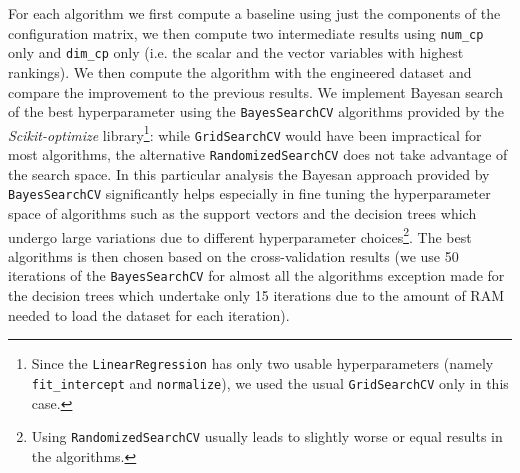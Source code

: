     For each algorithm we first compute a baseline using just the components of the configuration matrix, we then compute two intermediate results using \texttt{num\_cp} only and \texttt{dim\_cp} only (i.e. the scalar and the vector variables with highest rankings). We then compute the algorithm with the engineered dataset and compare the improvement to the previous results. We implement Bayesan search of the best hyperparameter using the \texttt{BayesSearchCV} algorithms provided by the \textit{Scikit-optimize} library\footnote{Since the \texttt{LinearRegression} has only two usable hyperparameters (namely \texttt{fit\_intercept} and \texttt{normalize}), we used the usual \texttt{GridSearchCV} only in this case.}: while \texttt{GridSearchCV} would have been impractical for most algorithms, the alternative \texttt{RandomizedSearchCV} does not take advantage of the search space. In this particular analysis the Bayesan approach provided by \texttt{BayesSearchCV} significantly helps especially in fine tuning the hyperparameter space of algorithms such as the support vectors and the decision trees which undergo large variations due to different hyperparameter choices\footnote{Using \texttt{RandomizedSearchCV} usually leads to slightly worse or equal results in the algorithms.}. The best algorithms is then chosen based on the cross-validation results (we use 50 iterations of the \texttt{BayesSearchCV} for almost all the algorithms exception made for the decision trees which undertake only 15 iterations due to the amount of RAM needed to load the dataset for each iteration).

